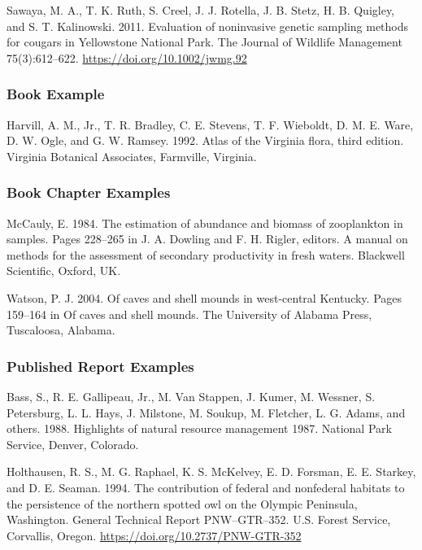 \documentclass[
]{article}
\begin{document}
Sawaya, M. A., T. K. Ruth, S. Creel, J. J. Rotella, J. B. Stetz, H. B.
Quigley, and S. T. Kalinowski. 2011. Evaluation of noninvasive genetic
sampling methods for cougars in Yellowstone National Park. The Journal
of Wildlife Management 75(3):612--622.
\url{https://doi.org/10.1002/jwmg.92}

\hypertarget{book-example}{%
\subsubsection{Book Example}\label{book-example}}

Harvill, A. M., Jr., T. R. Bradley, C. E. Stevens, T. F. Wieboldt, D. M.
E. Ware, D. W. Ogle, and G. W. Ramsey. 1992. Atlas of the Virginia
flora, third edition. Virginia Botanical Associates, Farmville,
Virginia.

\hypertarget{book-chapter-examples}{%
\subsubsection{Book Chapter Examples}\label{book-chapter-examples}}

McCauly, E. 1984. The estimation of abundance and biomass of zooplankton
in samples. Pages 228--265 in J. A. Dowling and F. H. Rigler, editors. A
manual on methods for the assessment of secondary productivity in fresh
waters. Blackwell Scientific, Oxford, UK.

Watson, P. J. 2004. Of caves and shell mounds in west-central Kentucky.
Pages 159--164 in Of caves and shell mounds. The University of Alabama
Press, Tuscaloosa, Alabama.

\hypertarget{published-report-examples}{%
\subsubsection{Published Report
Examples}\label{published-report-examples}}

Bass, S., R. E. Gallipeau, Jr., M. Van Stappen, J. Kumer, M. Wessner, S.
Petersburg, L. L. Hays, J. Milstone, M. Soukup, M. Fletcher, L. G.
Adams, and others. 1988. Highlights of natural resource management 1987.
National Park Service, Denver, Colorado.

Holthausen, R. S., M. G. Raphael, K. S. McKelvey, E. D. Forsman, E. E.
Starkey, and D. E. Seaman. 1994. The contribution of federal and
nonfederal habitats to the persistence of the northern spotted owl on
the Olympic Peninsula, Washington. General Technical Report
PNW--GTR--352. U.S. Forest Service, Corvallis, Oregon.
\url{https://doi.org/10.2737/PNW-GTR-352}
\end{document}
